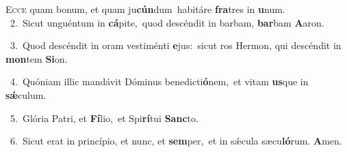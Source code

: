 \lettrine{\initial\textcolor{\initialcolor}{E}}{cce} quam bonum, et quam ju\-\textbf{cún}\-dum~\star habitáre \textbf{fra}\-tres in \textbf{u}\-num.\\
{\numbfont\textcolor{\numbcolor}{~2.}}~Sicut unguéntum in \textbf{cá}\-pite,~\star quod descéndit in barbam, \textbf{bar}\-bam \textbf{A}\-aron.\par
{\numbfont\textcolor{\numbcolor}{~3.}}~Quod descéndit in oram vestiménti \textbf{e}\-jus:~\star sicut ros Hermon, qui descéndit in \textbf{mon}\-tem \textbf{Si}\-on.\par
{\numbfont\textcolor{\numbcolor}{~4.}}~Quóniam illic mandávit Dóminus benedicti\-\textbf{ó}\-nem,~\star et vitam \textbf{us}\-que in \textbf{sǽ}\-culum.\par
{\numbfont\textcolor{\numbcolor}{~5.}}~Glória Patri, et \textbf{Fí}\-lio,~\star et Spi\-\textbf{rí}\-tui \textbf{Sanc}\-to.\par
{\numbfont\textcolor{\numbcolor}{~6.}}~Sicut erat in princípio, et nunc, et \textbf{sem}\-per,~\star et in sǽcula sæcu\-\textbf{ló}\-rum. \textbf{A}\-men.\par
